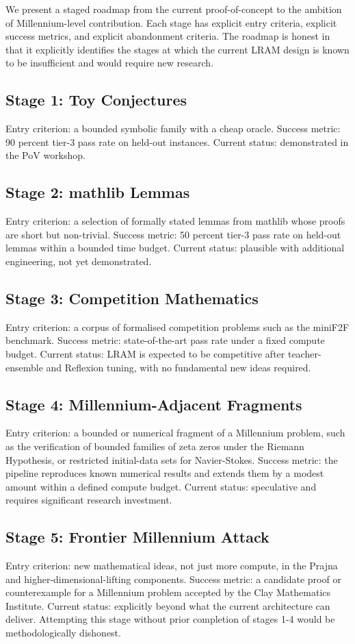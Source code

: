 We present a staged roadmap from the current proof-of-concept to the ambition of Millennium-level contribution. Each stage has explicit entry criteria, explicit success metrics, and explicit abandonment criteria. The roadmap is honest in that it explicitly identifies the stages at which the current LRAM design is known to be insufficient and would require new research.

\subsection{Stage 1: Toy Conjectures}
Entry criterion: a bounded symbolic family with a cheap oracle. Success metric: 90 percent tier-3 pass rate on held-out instances. Current status: demonstrated in the PoV workshop.

\subsection{Stage 2: mathlib Lemmas}
Entry criterion: a selection of formally stated lemmas from mathlib whose proofs are short but non-trivial. Success metric: 50 percent tier-3 pass rate on held-out lemmas within a bounded time budget. Current status: plausible with additional engineering, not yet demonstrated.

\subsection{Stage 3: Competition Mathematics}
Entry criterion: a corpus of formalised competition problems such as the miniF2F benchmark. Success metric: state-of-the-art pass rate under a fixed compute budget. Current status: LRAM is expected to be competitive after teacher-ensemble and Reflexion tuning, with no fundamental new ideas required.

\subsection{Stage 4: Millennium-Adjacent Fragments}
Entry criterion: a bounded or numerical fragment of a Millennium problem, such as the verification of bounded families of zeta zeros under the Riemann Hypothesis, or restricted initial-data sets for Navier-Stokes. Success metric: the pipeline reproduces known numerical results and extends them by a modest amount within a defined compute budget. Current status: speculative and requires significant research investment.

\subsection{Stage 5: Frontier Millennium Attack}
Entry criterion: new mathematical ideas, not just more compute, in the Prajna and higher-dimensional-lifting components. Success metric: a candidate proof or counterexample for a Millennium problem accepted by the Clay Mathematics Institute. Current status: explicitly beyond what the current architecture can deliver. Attempting this stage without prior completion of stages 1-4 would be methodologically dishonest.

